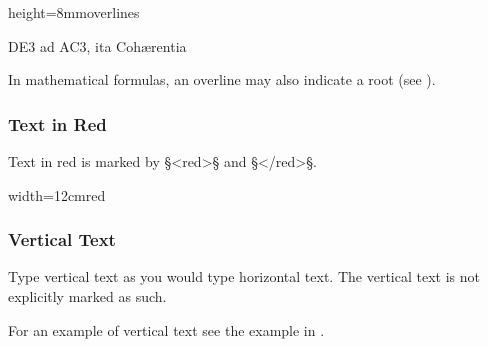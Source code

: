 \begin{sampleImageSmall}[2: \, overlines]{height=8mm}{overlines}

\begin{typeLatin}
DE3\bold{</^>} ad AC3\bold{</^>}, ita Cohærentia \\
\end{typeLatin}
\end{sampleImageSmall}

\begin{crossref}
In mathematical formulas, an overline may also indicate a root (see ).
\end{crossref}


\subsubsection{Text in Red}
\label{section text in red}

\begin{mainruleLessImportant}
Text in red is marked by §<red>§ and §</red>§. 
\end{mainruleLessImportant}

\vspace{3mm}
\begin{sampleImageSmall}{width=12cm}{red}

\end{sampleImageSmall}

\subsubsection{Vertical Text}

\begin{mainrule}
Type vertical text as you would type horizontal text. The vertical text is not explicitly marked as such.
\end{mainrule}

\begin{crossref}
For an example of vertical text see the example in .
\end{crossref}


